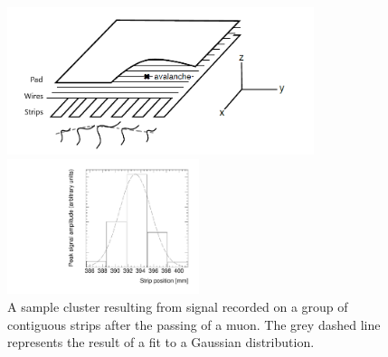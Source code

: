 \newpage
\thispagestyle{empty}
\begin{figure}
    \centering
    \includegraphics[width = 0.8\textwidth]{figures/mwpc_lefebvre_thesis_gatti.png}
    \caption{Schematic diagram representing the three types of electrodes in a sTGC detector. The position of the ionization avalanche is extracted from the wires and strips that picked up the avalanche signal. The signals on individual strips are sketched. Clustering is the process by which a Gaussian function (represented by the grey dashed line) is fitted to the distribution of the signal amplitude on individual contiguous strips; a sample cluster is shown in figure~\ref{fig:sample_cluster}. In this work, the $x$($y$)-coordinate will always refer to the coordinate perpendicular to the wires (strips). The $z$-coordinate is perpendicular to the sTGC surface~\cite{lefebvre_thesis, gatti_optimum_1979}.}
    \label{fig:mwpc_coords}
    \vspace*{\floatsep}
    \centering
    \includegraphics[width = 0.5\textwidth]{figures/sample_cluster_QL2C04_event5_layer2.pdf}
    \caption{A sample cluster resulting from signal recorded on a group of contiguous strips after the passing of a muon. The grey dashed line represents the result of a fit to a Gaussian distribution.}
    \label{fig:sample_cluster}
\end{figure}
\newpage
\restoregeometry

